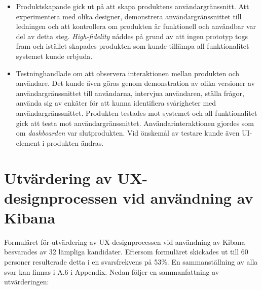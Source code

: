 \documentclass[12pt]{kththesis}
\begin{document}
\begin{itemize}
\item Produktskapande gick ut på att skapa produktens användargränssnitt. Att experimentera med olika designer, demonstrera användargränssnittet till ledningen och att kontrollera om produkten är funktionell och användbar var del av detta steg. \textit{High-fidelity} nåddes på grund av att ingen prototyp togs fram och istället skapades produkten som kunde tillämpa all funktionalitet systemet kunde erbjuda.
\item Testninghandlade om att observera interaktionen mellan produkten och användare. Det kunde även göras genom demonstration av olika versioner av användargränssnittet till användarna, intervjua användaren, ställa frågor, använda sig av enkäter för att kunna identifiera svårigheter med användargränssnittet. Produkten testades mot systemet och all funktionalitet gick att testa mot användargränssnittet. Användarinteraktionen gjordes som om \textit{dashboarden} var slutprodukten. Vid önskemål av testare kunde även UI-element i produkten ändras. 
\end{itemize}

\section{Utvärdering av UX-designprocessen vid användning av Kibana}
Formuläret för utvärdering av UX-designprocessen vid användning av Kibana besvarades av 32 lämpliga kandidater. Eftersom formuläret skickades ut till 60 personer resulterade detta i en svarsfrekvens på 53\%. En sammanställning av alla svar kan finnas i A.6 i Appendix. Nedan följer en sammanfattning av utvärderingen:
\end{document}
